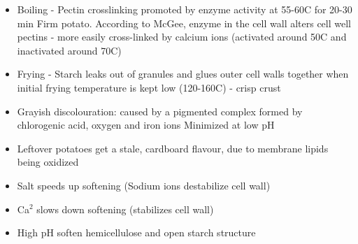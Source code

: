\begin{highlight}
    \begin{itemize}
        \item Boiling - Pectin crosslinking promoted by enzyme activity at 55-60\textdegree C for 20-30 min
        \subitem Firm potato. According to McGee, enzyme in the cell wall alters cell well pectins - more easily cross-linked by calcium ions (activated around 50\textdegree C and inactivated around 70\textdegree C)
        \item Frying - Starch leaks out of granules and glues outer cell walls together when initial frying temperature is kept low (120-160\textdegree C) - crisp crust
        \item Grayish discolouration: caused by a pigmented complex formed by chlorogenic acid, oxygen and iron ions
        \subitem Minimized at low pH
        \item Leftover potatoes get a stale, cardboard flavour, due to membrane lipids being oxidized
        \item Salt speeds up softening (Sodium ions destabilize cell wall)
        \item Ca$^2$ slows down softening (stabilizes cell wall)
        \item High pH soften hemicellulose and open starch structure
    \end{itemize}
\end{highlight}





